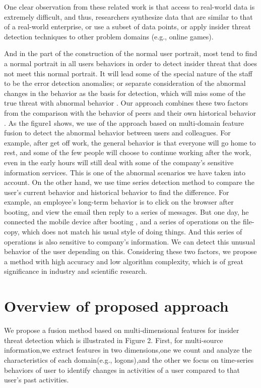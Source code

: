 \documentclass[conference]{IEEEtran}
\begin{document}
One clear observation from these related work is that access to real-world data is extremely difficult, and thus, researchers synthesize data that are similar to that of a real-world enterprise, or use a subset of data points, or apply insider threat detection techniques to other problem domains (e.g., online games).

And in the part of the construction of the normal user portrait, most tend to find a normal portrait in all users behaviors in order to detect insider threat that does not meet this normal portrait. It will lead some of the special nature of the staff to be the error detection anomalies; or separate consideration of the abnormal changes in the behavior as the basis for detection, which will miss some of the true threat with abnormal behavior . Our approach combines these two factors from the comparison with the behavior of peers and their own historical behavior . As the figure1 shows, we use of the approach based on multi-domain feature fusion to detect the abnormal behavior between users and colleagues. For example, after get off work, the general behavior is that everyone will go home to rest, and some of the few people will choose to continue working after the work, even in the early hours will still deal with some of the company's sensitive information services. This is one of the abnormal scenarios we have taken into account. On the other hand, we use time series detection method to compare the user's current behavior and historical behavior to find the difference. For example, an employee's long-term behavior is to click on the browser after booting, and view the email then reply to a series of messages. But one day, he connected the mobile device after booting , and a series of operations on the file-copy, which does not match his usual style of doing things. And this series of operations is also sensitive to company's information. We can detect this unusual behavior of the user depending on this. Considering these two factors, we propose a method with high accuracy and low algorithm complexity, which is of great significance in industry and scientific research.

\section{Overview of proposed approach}

We propose a fusion method based on multi-dimensional features for insider threat detection which is illustrated in Figure 2. First, for multi-source information,we extract features in two dimensions,one we count and analyze the characteristics of each domain(e.g., logons),and the other we focus on time-series behaviors of user to identify changes in activities of a user compared to that user’s past activities.
\end{document}
